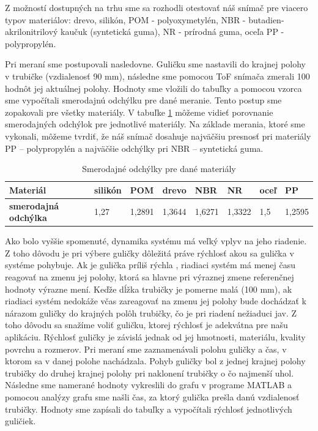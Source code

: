 Z možností dostupných na trhu sme sa rozhodli otestovať náš snímač  pre viacero typov materiálov: 
 drevo, silikón, POM - polyoxymetylén, NBR - butadien-akrilonitrilový kaučuk (syntetická guma), NR - prírodná guma, oceľa PP - polypropylén.


Pri meraní sme postupovali nasledovne. Guličku sme nastavili do krajnej polohy v trubičke (vzdialenosť 90 mm), následne sme pomocou ToF snímača zmerali 100 hodnôt jej aktuálnej polohy. Hodnoty sme vložili do tabuľky a pomocou vzorca sme vypočítali smerodajnú odchýlku pre dané meranie. Tento postup sme zopakovali pre všetky materiály. V tabuľke \ref{TABULKA_2_1} môžeme vidieť porovnanie smerodajných odchýlok pre jednotlivé materiály. Na základe merania, ktoré sme vykonali, môžeme tvrdiť, že náš snímač dosahuje najväčšiu presnosť pri materiály PP – polypropylén a najväčšie odchýlky pri NBR – syntetická guma. 


\begin{table}[ht]
	\centering
    \begin{tabular}{|l|l|l|l|l|l|l|l|}
    	\hline
    	\textbf{Materiál}            & silikón & POM    & drevo  & NBR                            & NR     & oceľ & PP                             \\ \hline
    	\textbf{smerodajná odchýlka} & 1,27    & 1,2891 & 1,3644 & \cellcolor[HTML]{FFCCC9}1,6271 & 1,3322 & 1,5  & \cellcolor[HTML]{9AFF99}1,2595 \\ \hline
    \end{tabular}
	
    \caption{Smerodajné odchýlky pre dané materiály}
    \label{TABULKA_2_1}
\end{table}
Ako bolo vyššie spomenuté, dynamika systému má veľký vplyv na jeho riadenie. Z toho dôvodu je pri výbere guličky dôležitá práve rýchlosť akou sa gulička v systéme pohybuje. Ak je gulička príliš rýchla  , riadiaci systém má menej času reagovať na zmenu jej polohy, ktorá sa hlavne pri výraznej zmene referenčnej hodnoty výrazne mení. Keďže dĺžka trubičky je pomerne malá (100 mm), ak riadiaci systém nedokáže včas zareagovať  na zmenu jej polohy bude dochádzať k nárazom guličky do krajných polôh trubičky, čo je pri riadení nežiaduci jav. Z toho dôvodu sa snažíme voliť guličku, ktorej rýchlosť je adekvátna pre našu aplikáciu. Rýchlosť guličky je závislá jednak od jej hmotnosti, materiálu, kvality povrchu a rozmerov.
Pri meraní sme zaznamenávali polohu guličky a čas, v ktorom sa v danej polohe nachádzala. Pohyb guličky bol z jednej krajnej polohy trubičky do druhej krajnej polohy pri naklonení trubičky o čo najmenší uhol. Následne sme namerané hodnoty vykreslili do grafu v programe MATLAB a pomocou analýzy grafu sme našli čas, za ktorý gulička prešla danú vzdialenosť trubičky. Hodnoty sme zapísali do tabuľky a vypočítali rýchlosť jednotlivých guličiek.

